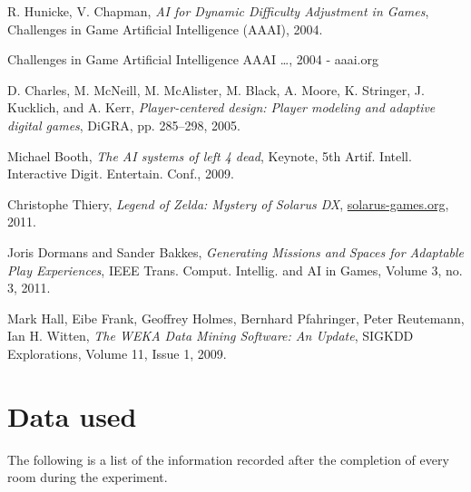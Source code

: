 \documentclass[a4paper]{article}
\begin{document}
\begin{multicols*}{2}
\begin{thebibliography}{9}
R. Hunicke, V. Chapman, 
\emph{AI for Dynamic Difficulty Adjustment in Games},
Challenges in Game Artificial Intelligence (AAAI),
2004.

 Challenges in Game Artificial Intelligence AAAI …, 2004 - aaai.org

D. Charles, M. McNeill, M. McAlister, M. Black, A. Moore, K. Stringer, J. Kucklich, and A. Kerr, 
\emph{Player-centered design: Player modeling and
adaptive digital games},
DiGRA, pp. 285–298,
2005.

Michael Booth,
\emph{The AI systems of left 4 dead},
Keynote, 5th Artif. Intell. Interactive Digit. Entertain. Conf.,
2009.

Christophe Thiery,
\emph{Legend of Zelda: Mystery of Solarus DX},
\url{solarus-games.org},
2011.

Joris Dormans and Sander Bakkes,
\emph{Generating Missions and Spaces for
Adaptable Play Experiences},
{IEEE} Trans. Comput. Intellig. and {AI} in Games, Volume 3, no. 3,
2011.

Mark Hall, Eibe Frank, Geoffrey Holmes, Bernhard Pfahringer, Peter Reutemann, Ian H. Witten,
\emph{The WEKA Data Mining Software: An Update},
SIGKDD Explorations, Volume 11, Issue 1,
2009.

\end{thebibliography}
\end{multicols*}

\clearpage
\appendix
\section{Data used}
The following is a list of the information recorded after the completion of every room during the experiment.
\end{document}
